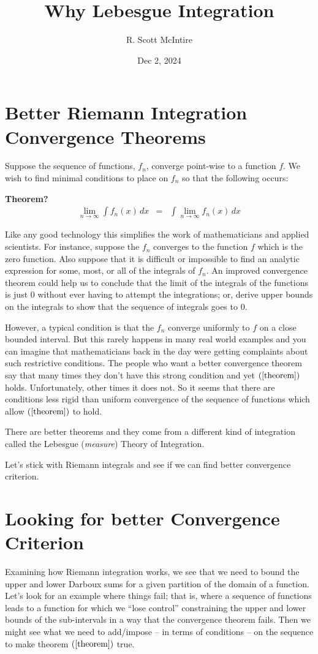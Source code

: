 \documentclass{article}
\title{Why Lebesgue Integration}
\author{R. Scott McIntire}
\date{Dec 2, 2024}
\begin{document}
\maketitle


\section{Better Riemann Integration Convergence Theorems}
Suppose the sequence of functions, $f_n$, converge point-wise to a function $f$.
We wish to find minimal conditions to place on $f_n$ so that the following occurs:

{\bf Theorem?}
\begin{eqnarray}
	\lim_{n \rightarrow \infty}\limits \int f_n(x) \, dx & = & \int \lim_{n \rightarrow \infty}\limits f_n(x) \, dx \label{theorem}
\end{eqnarray}

Like any good technology this simplifies the work of mathematicians 
and applied scientists. For instance, suppose the $f_n$ converges to the function $f$ 
which is the zero function. Also suppose that it is difficult or impossible to 
find an analytic expression for some, most, or all of the integrals of $f_n$. 
An improved convergence theorem could help us to conclude that the limit of the integrals of 
the functions is just $0$ without ever having to attempt the integrations; or, 
derive upper bounds on the integrals to show that 
the sequence of integrals goes to $0$.

However, a typical condition is that the $f_n$ converge 
uniformly to $f$ on a close bounded interval. 
But this rarely happens in many real world examples and you can imagine that
mathematicians back in the day
were getting complaints about such restrictive 
conditions. The people who want a better convergence theorem say that many 
times they don't have this strong condition and yet $(\ref{theorem})$
holds. Unfortunately, other times it does not. So it seems that there are 
conditions less rigid than uniform convergence of the sequence of 
functions which allow $(\ref{theorem})$ to hold.

There are better theorems and they come from a different kind of integration called 
the Lebesgue ({\em measure\/}) Theory of Integration.

Let's stick with Riemann integrals and see if we can find better convergence 
criterion.

\section{Looking for better Convergence Criterion}
Examining how Riemann integration works, we see that we need to bound the upper 
and lower Darboux sums for a given partition of the domain of a function. 
Let's look for an example where things fail; that is, where 
a sequence of functions leads to a function for which we ``lose control'' 
constraining the upper and lower bounds of the sub-intervals in a way that the 
convergence theorem fails. Then we might see what we need to add/impose 
-- in terms of conditions -- on the sequence to make theorem 
$(\ref{theorem})$ true.
\end{document}
